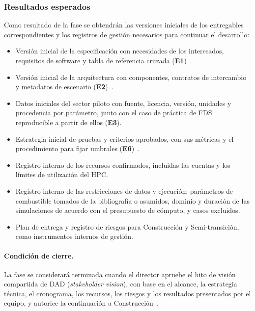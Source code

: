 \subsubsection{Resultados esperados}\label{sec:inicio-resultados}

Como resultado de la fase se obtendrán las versiones iniciales de
los entregables correspondientes y los registros de gestión
necesarios para continuar el desarrollo:

\begin{itemize}
    \item Versión inicial de la especificación con necesidades de
    los interesados, requisitos de software y tabla de referencia
    cruzada (\textbf{E1})~\cite{iso29148}.

    \item Versión inicial de la arquitectura con componentes,
    contratos de intercambio y metadatos de escenario
    (\textbf{E2})~\cite{uml251,iso12207}.

    \item Datos iniciales del sector piloto con fuente, licencia,
    versión, unidades y procedencia por parámetro, junto con el
    caso de práctica de FDS reproducible a partir de ellos
    (\textbf{E3}).

    \item Estrategia inicial de pruebas y criterios aprobados, con
    sus métricas y el procedimiento para fijar umbrales
    (\textbf{E6})~\cite{iso291192,iso291193,iso291194}.

    \item Registro interno de los recursos confirmados, incluidas
    las cuentas y los límites de utilización del HPC.

    \item Registro interno de las restricciones de datos y
    ejecución: parámetros de combustible tomados de la bibliografía
    o asumidos, dominio y duración de las simulaciones de acuerdo
    con el presupuesto de cómputo, y casos excluidos.

    \item Plan de entrega y registro de riesgos para Construcción
    y Semi-transición, como instrumentos internos de gestión.
\end{itemize}

\paragraph{Condición de cierre.}
La fase se considerará terminada cuando el director apruebe el
hito de visión compartida de DAD (\textit{stakeholder vision}),
con base en el alcance, la estrategia técnica, el cronograma,
los recursos, los riesgos y los resultados presentados por el
equipo, y autorice la continuación a
Construcción~\cite{amblerLines2012}.


